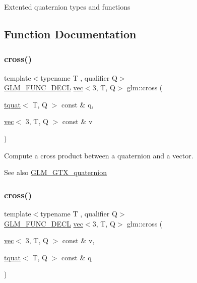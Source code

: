Extented quaternion types and functions 

\subsection{Function Documentation}
\mbox{\label{group__gtx__quaternion_ga8639615408166d0dddda1b91a940b338}} 
\subsubsection{\texorpdfstring{cross()}{cross()}\hspace{0.1cm}{\footnotesize\ttfamily [1/2]}}
{\footnotesize\ttfamily template$<$typename T , qualifier Q$>$ \\
\mbox{\hyperlink{setup_8hpp_ab2d052de21a70539923e9bcbf6e83a51}{G\+L\+M\+\_\+\+F\+U\+N\+C\+\_\+\+D\+E\+CL}} \mbox{\hyperlink{structglm_1_1vec}{vec}}$<$3, T, Q$>$ glm\+::cross (\begin{DoxyParamCaption}\item[{\mbox{\hyperlink{structglm_1_1tquat}{tquat}}$<$ T, Q $>$ const \&}]{q,  }\item[{\mbox{\hyperlink{structglm_1_1vec}{vec}}$<$ 3, T, Q $>$ const \&}]{v }\end{DoxyParamCaption})}

Compute a cross product between a quaternion and a vector.

\begin{DoxySeeAlso}{See also}
\mbox{\hyperlink{group__gtx__quaternion}{G\+L\+M\+\_\+\+G\+T\+X\+\_\+quaternion}} 
\end{DoxySeeAlso}
\mbox{\label{group__gtx__quaternion_gaa75ca5654e0dc3b61c05db091f7d46ce}} 
\subsubsection{\texorpdfstring{cross()}{cross()}\hspace{0.1cm}{\footnotesize\ttfamily [2/2]}}
{\footnotesize\ttfamily template$<$typename T , qualifier Q$>$ \\
\mbox{\hyperlink{setup_8hpp_ab2d052de21a70539923e9bcbf6e83a51}{G\+L\+M\+\_\+\+F\+U\+N\+C\+\_\+\+D\+E\+CL}} \mbox{\hyperlink{structglm_1_1vec}{vec}}$<$3, T, Q$>$ glm\+::cross (\begin{DoxyParamCaption}\item[{\mbox{\hyperlink{structglm_1_1vec}{vec}}$<$ 3, T, Q $>$ const \&}]{v,  }\item[{\mbox{\hyperlink{structglm_1_1tquat}{tquat}}$<$ T, Q $>$ const \&}]{q }\end{DoxyParamCaption})}

